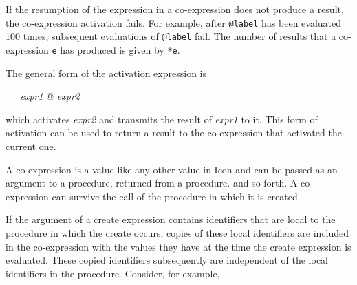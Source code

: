 If the resumption of the expression in a co-expression does not
produce a result, the co-expression activation fails.  For example,
after \texttt{@label} has been evaluated 100 times, subsequent
evaluations of \texttt{@label} fail. The number of results that a
co-expression \texttt{e} has produced is given by \texttt{*e}.

The general form of the activation expression is

\textit{\ \ \ expr1 }@ \textit{expr2}

\noindent which activates \textit{expr2} and transmits the result of
\textit{expr1} to it. This form of activation can be used to return a
result to the co-expression that activated the current one.

A co-expression is a value like any other value in Icon and can be
passed as an argument to a procedure, returned from a procedure. and
so forth. A co-expression can survive the call of the procedure in
which it is created.

If the argument of a create expression contains identifiers that are
local to the procedure in which the create occurs, copies of these
local identifiers are included in the co-expression with the values
they have at the time the create expression is evaluated. These copied
identifiers subsequently are independent of the local identifiers in
the procedure. Consider, for example,



